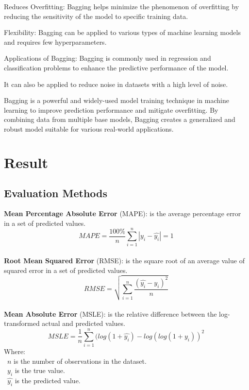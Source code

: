 \documentclass{ieeeojies}
\begin{document}
Reduces Overfitting: Bagging helps minimize the phenomenon of overfitting by reducing the sensitivity of the model to specific training data.

Flexibility: Bagging can be applied to various types of machine learning models and requires few hyperparameters.

Applications of Bagging:
Bagging is commonly used in regression and classification problems to enhance the predictive performance of the model.

It can also be applied to reduce noise in datasets with a high level of noise.

Bagging is a powerful and widely-used model training technique in machine learning to improve prediction performance and mitigate overfitting. By combining data from multiple base models, Bagging creates a generalized and robust model suitable for various real-world applications.
\section{Result}
\subsection{Evaluation Methods}
\textbf{Mean Percentage Absolute Error} (MAPE): is the average percentage error in a set of predicted values.\\
\[MAPE=\frac{100\%}{n}  \sum_{i=1}^{n} |y_i-\hat{y_i} |  = 1 \]\\
\textbf{Root Mean Squared Error} (RMSE): is the square root of an average value of squared error in a set of predicted values.\\
\[RMSE=\sqrt{\sum_{i=1}^{n} \frac{(\hat{y_i}-y_i )^2}{n} }\]\\
\textbf{Mean Absolute Error} (MSLE): is the relative difference between the log-transformed actual and predicted values.\\
\[MSLE=\frac{1}{n}\sum_{i=1}^{n}(log(1+\hat{y_i})-log(log(1+y_i))^2\]
Where: \\
	\indent\textbullet\ \(n\) is the number of observations in the dataset.\\
	\indent\textbullet\ \(y_i\)  is the true value.\\
	\indent\textbullet\ \(\hat{y_i}\) is the predicted value.
\end{document}
